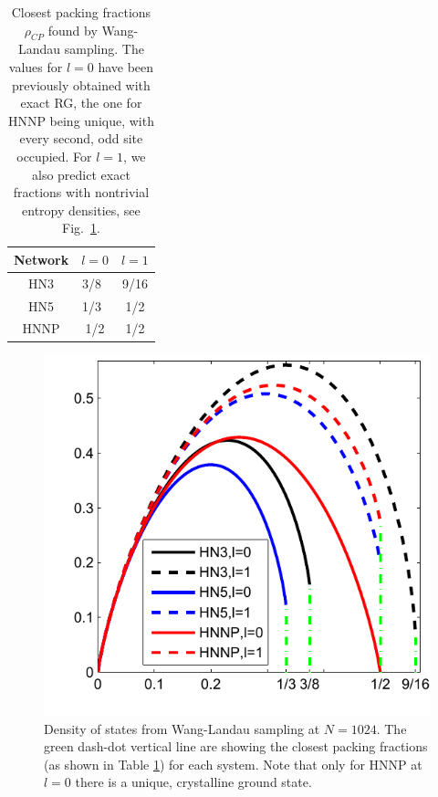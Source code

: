 \begin{table}
\begin{centering}
\protect\caption{\label{tab:cpf} Closest packing fractions $\rho_{CP}$ found by Wang-Landau sampling.
The values for $l=0$ have been previously obtained with exact RG,
the one for HNNP being unique, with every second, odd site occupied.
For $l=1$, we also predict exact fractions with nontrivial entropy
densities, see Fig.~\ref{fig:doswl}. }

\par\end{centering}

\begin{centering}

\par\end{centering}

\centering{}%
\begin{tabular}{|c|c||c|}
\hline 
Network & $l=0$  & $l=1$ \tabularnewline
\hline 
\hline 
HN3  & 3/8~\cite{BoHa11} & 9/16 \tabularnewline
\hline 
HN5  & 1/3~\cite{BoHa11} & 1/2 \tabularnewline
\hline 
HNNP  & 1/2  & 1/2 \tabularnewline
\hline 
\end{tabular}
\end{table}


\begin{figure}
\centering \includegraphics[width=0.8\columnwidth]{Chapter-2/Paper_DOS_Plot2}
\protect\caption{Density of states from Wang-Landau sampling at $N=1024$. The green
dash-dot vertical line are showing the closest packing fractions (as
shown in Table \ref{tab:cpf}) for each system. Note that only for
HNNP at $l=0$ there is a unique, crystalline ground state. }

\label{fig:doswl} 
\end{figure}


